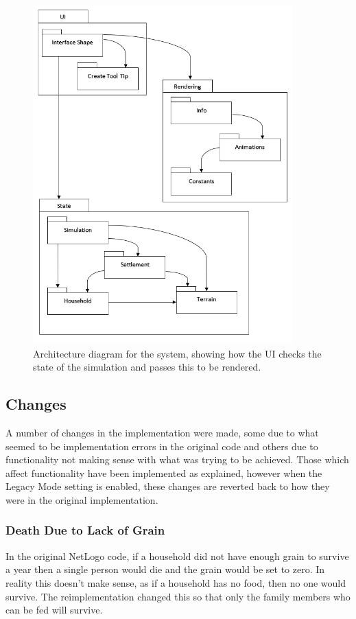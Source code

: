 \documentclass[12pt]{article}
\begin{document}
		\begin{figure}[!htb]
		\includegraphics[width=10cm]{ArchitectureDiagram}
		\caption{Architecture diagram for the system, showing how the UI checks the state of the simulation and passes this to be rendered.}
		\label{fig:Architecture}
		\end{figure}
	
		\subsection{Changes}
			A number of changes in the implementation were made, some due to what seemed to be implementation errors in the original code and others due to functionality not making sense with what was trying to be achieved. Those which affect functionality have been implemented as explained, however when the Legacy Mode setting is enabled, these changes are reverted back to how they were in the original implementation.
				\subsubsection{Death Due to Lack of Grain}
				In the original NetLogo code, if a household did not have enough grain to survive a year then a single person would die and the grain would be set to zero. In reality this doesn't make sense, as if a household has no food, then no one would survive. The reimplementation changed this so that only the family members who can be fed will survive.\\
\end{document}
